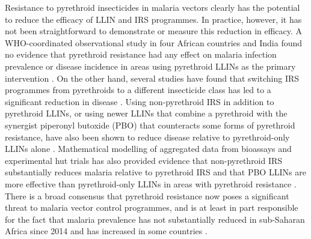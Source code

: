 \documentclass[a4paper,11pt,abstracton,hidelinks]{scrartcl}
\begin{document}
Resistance to pyrethroid insecticides in malaria vectors clearly has the potential to reduce the efficacy of LLIN and IRS programmes.
%
In practice, however, it has not been straightforward to demonstrate or measure this reduction in efficacy.
%
A WHO-coordinated observational study in four African countries and India found no evidence that pyrethroid resistance had any effect on malaria infection prevalence or disease incidence in areas using pyrethroid LLINs as the primary intervention \citep{Kleinschmidt2018}.
%
On the other hand, several studies have found that switching IRS programmes from pyrethroids to a different insecticide class has led to a significant reduction in disease \citep{Hargreaves2000,Kafy2017}. 
%
Using non-pyrethroid IRS in addition to pyrethroid LLINs, or using newer LLINs that combine a pyrethroid with the synergist piperonyl butoxide (PBO) that counteracts some forms of pyrethroid resistance, have also been shown to reduce disease relative to pyrethroid-only LLINs alone \citep{Protopopoff2018}. 
%
Mathematical modelling of aggregated data from bioassays and experimental hut trials has also provided evidence that non-pyrethroid IRS substantially reduces malaria relative to pyrethroid IRS \citep{SherrardSmith2018} and that PBO LLINs are more effective than pyrethroid-only LLINs in areas with pyrethroid resistance \citep{Churcher2016}.
%
There is a broad consensus that pyrethroid resistance now poses a significant threat to malaria vector control programmes, and is at least in part responsible for the fact that malaria prevalence has not substantially reduced in sub-Saharan Africa since 2014 and has increased in some countries \citep{Hemingway2016,WHO2019WMR}. 


\printbibliography
\end{document}
